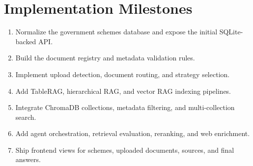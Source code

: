 \documentclass[11pt]{article}
\begin{document}
\section{Implementation Milestones}

\begin{enumerate}
  \item Normalize the government schemes database and expose the initial SQLite-backed API.
  \item Build the document registry and metadata validation rules.
  \item Implement upload detection, document routing, and strategy selection.
  \item Add TableRAG, hierarchical RAG, and vector RAG indexing pipelines.
  \item Integrate ChromaDB collections, metadata filtering, and multi-collection search.
  \item Add agent orchestration, retrieval evaluation, reranking, and web enrichment.
  \item Ship frontend views for schemes, uploaded documents, sources, and final answers.
\end{enumerate}
\end{document}
